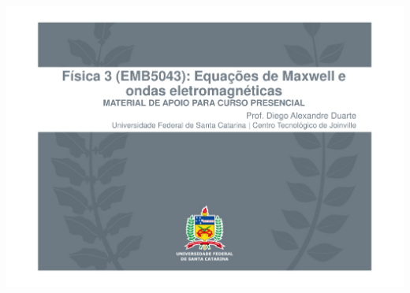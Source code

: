 \begin{frame}
    \centering
    \includegraphics[height=0.95\textheight, page=13]{images/Equações-de-Maxwell.pdf}
\end{frame}

